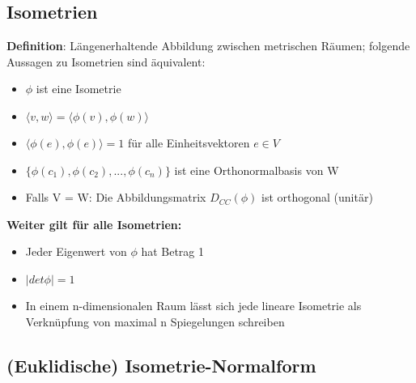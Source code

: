 \documentclass[10pt,a4paper]{article}
\begin{document}
	\subsection{Isometrien}
	\label{os:sub:isometrien}	

	\textbf{Definition}: Längenerhaltende Abbildung zwischen metrischen Räumen; folgende Aussagen zu Isometrien sind äquivalent:
	\begin{itemize}
		\item $\phi$ ist eine Isometrie
		\item $\langle v, w\rangle = \langle \phi(v), \phi(w)\rangle$
		\item $\langle \phi(e), \phi(e)\rangle = 1$ für alle Einheitsvektoren $e \in V$
		\item $\{\phi(c_1), \phi(c_2), ..., \phi(c_n)\}$ ist eine Orthonormalbasis von W
		\item Falls V = W: Die Abbildungsmatrix $D_{CC}(\phi)$ ist orthogonal (unitär)
	\end{itemize}
	\textbf{Weiter gilt für alle Isometrien:}
	\begin{itemize}
		\item Jeder Eigenwert von $\phi$ hat Betrag 1
		\item $|det \phi| = 1$
		\item In einem n-dimensionalen Raum lässt sich jede lineare Isometrie als Verknüpfung von maximal n Spiegelungen schreiben
	\end{itemize}

	\subsection{(Euklidische) Isometrie-Normalform}
	\label{os:sub:euklidische_isometrie_normalform}
\end{document}
